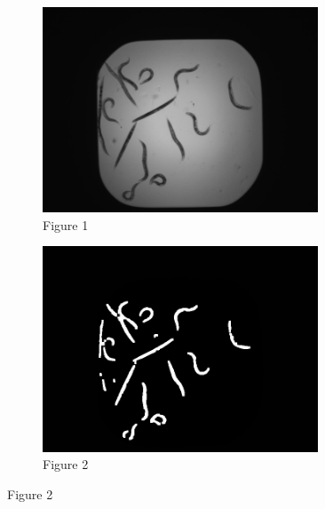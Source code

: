 \documentclass[a4paper,12pt]{article}
\begin{document}
\begin{figure}[ht!]
    \centering
    \begin{subfigure}{0.5\textwidth}
        \centering
        \includegraphics[width=0.9\textwidth]{A01_step0.jpg}
        \captionsetup{labelformat=empty}
        \caption{Figure 1}
    \end{subfigure}%
    \begin{subfigure}{0.5\textwidth}
        \centering
        \includegraphics[width=0.9\textwidth]{A01_step1.jpg}
        \captionsetup{labelformat=empty}
        \caption{Figure 2}
    \end{subfigure}
\end{figure}
\end{document}
